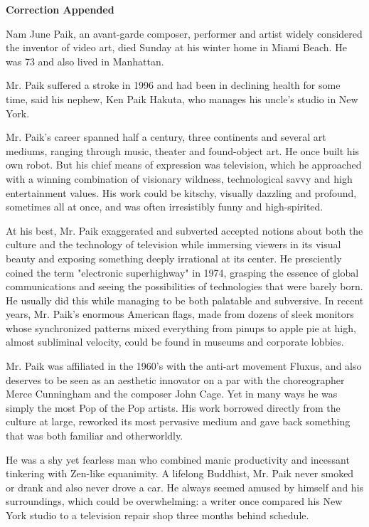 \textbf{Correction Appended}

Nam June Paik, an avant-garde composer, performer and artist widely
considered the inventor of video art, died Sunday at his winter home in
Miami Beach. He was 73 and also lived in Manhattan.

Mr. Paik suffered a stroke in 1996 and had been in declining health for
some time, said his nephew, Ken Paik Hakuta, who manages his uncle's
studio in New York.

Mr. Paik's career spanned half a century, three continents and several
art mediums, ranging through music, theater and found-object art. He
once built his own robot. But his chief means of expression was
television, which he approached with a winning combination of visionary
wildness, technological savvy and high entertainment values. His work
could be kitschy, visually dazzling and profound, sometimes all at once,
and was often irresistibly funny and high-spirited.

At his best, Mr. Paik exaggerated and subverted accepted notions about
both the culture and the technology of television while immersing
viewers in its visual beauty and exposing something deeply irrational at
its center. He presciently coined the term "electronic superhighway" in
1974, grasping the essence of global communications and seeing the
possibilities of technologies that were barely born. He usually did this
while managing to be both palatable and subversive. In recent years, Mr.
Paik's enormous American flags, made from dozens of sleek monitors whose
synchronized patterns mixed everything from pinups to apple pie at high,
almost subliminal velocity, could be found in museums and corporate
lobbies.

Mr. Paik was affiliated in the 1960's with the anti-art movement Fluxus,
and also deserves to be seen as an aesthetic innovator on a par with the
choreographer Merce Cunningham and the composer John Cage. Yet in many
ways he was simply the most Pop of the Pop artists. His work borrowed
directly from the culture at large, reworked its most pervasive medium
and gave back something that was both familiar and otherworldly.

He was a shy yet fearless man who combined manic productivity and
incessant tinkering with Zen-like equanimity. A lifelong Buddhist, Mr.
Paik never smoked or drank and also never drove a car. He always seemed
amused by himself and his surroundings, which could be overwhelming: a
writer once compared his New York studio to a television repair shop
three months behind schedule.

